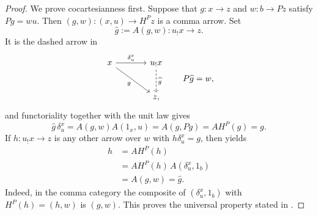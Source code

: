 \documentclass[11pt]{article}
\theoremstyle{plain}
\theoremstyle{definition}
\theoremstyle{remark}
\numberwithin{equation}{section}
\begin{document}
\begin{proof}
We prove cocartesianness first.  Suppose that $g\colon x\to z$ and
$w\colon b\to Pz$ satisfy $Pg=wu$.  Then
$(g,w)\colon(x,u)\to H^{P}z$ is a comma arrow.  Set
\begin{equation*}
\widehat g:=A(g,w)\colon u_{!}x\longrightarrow z.
\end{equation*}
It is the dashed arrow in
\begin{equation*}
\begin{tikzcd}[column sep=large,row sep=large]
x \arrow[r,"\delta^x_u"] \arrow[dr,"g"']
& u_!x \arrow[d,dashed,"\widehat g"] \\
& z,
\end{tikzcd}
\qquad P\widehat g=w,
\end{equation*}
and functoriality together with the unit law gives
\begin{equation}
\widehat g\,\delta^{x}_{u}
  =A(g,w)A(1_x,u)
  =A(g,Pg)
  =AH^{P}(g)
  =g.
  \label{eq:action-factorization}
\end{equation}
If $h\colon u_{!}x\to z$ is any other arrow over $w$ with
$h\delta^{x}_{u}=g$, then  yields
\begin{align*}
  h
  &=AH^{P}(h)\\
  &=AH^{P}(h)\,A(\delta^{x}_{u},1_b)\\
  &=A(g,w)=\widehat g.
\end{align*}
Indeed, in the comma category the composite of
$(\delta^{x}_{u},1_b)$ with $H^{P}(h)=(h,w)$ is $(g,w)$.
This proves the universal property stated in .


\end{proof}
\end{document}
